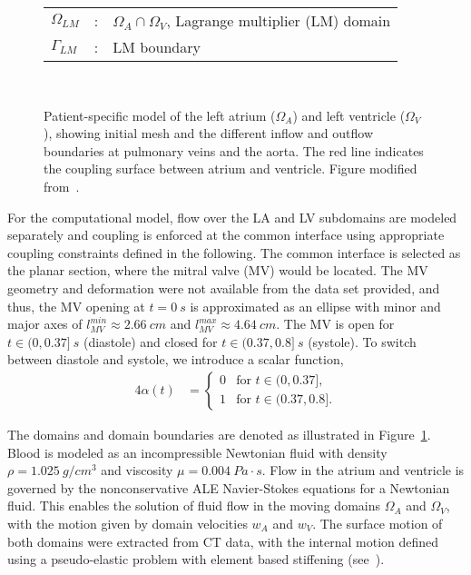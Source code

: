 \documentclass[3p]{elsarticle}
\begin{document}
\begin{figure}[ht!]
\begin{minipage}{0.37\linewidth}
\begin{tabular}{ l  c  l }
            \hline
            $\Omega_{LM}$   &:& $\Omega_A \cap \Omega_V$, Lagrange multiplier (LM) domain         \\
            $\Gamma_{LM}$   &:& LM boundary                             \\
        \end{tabular}
    \end{minipage}~\\
    \caption{Patient-specific model of the left atrium ($\Omega_A$) and left ventricle ($\Omega_V$),
        showing initial mesh and the different inflow and outflow boundaries at pulmonary veins and the aorta.
        The red line indicates the coupling surface between atrium and ventricle.
        Figure modified from~\cite[Figure 3]{MarleviEtAl2021}.}
    \label{lv-flow-application-coarse-mesh-views-fig}
\end{figure}

For the computational model, flow over the LA and LV subdomains
are modeled separately and coupling is enforced at the common interface
using appropriate coupling constraints defined in the following.
The common interface is selected as the planar section,
where the mitral valve (MV) would be located.
The MV geometry and deformation were not available from the data set
provided, and thus, the MV opening at $t = 0~s$ is approximated as an ellipse
with minor and major axes of $l_{MV}^{min} \approx 2.66~cm$ and $l_{MV}^{max} \approx 4.64~cm$.
The MV is open for $t \in (0, 0.37]~s$ (diastole) and closed for $t \in (0.37, 0.8]~s$ (systole).
To switch between diastole and systole, we introduce a scalar function,
\begin{alignat}{4}
    \alpha (t)
    &= \begin{cases}
        0 & \text{for } t \in (0, 0.37], \\
        1 & \text{for } t \in (0.37, 0.8].
    \end{cases}\label{alpha-switch-eqn}
\end{alignat}

The domains and domain boundaries are denoted as illustrated in Figure~\ref{lv-flow-application-coarse-mesh-views-fig}.
Blood is modeled as an incompressible Newtonian fluid
with density $\rho = 1.025~g / cm^3$
and viscosity $\mu = 0.004~Pa \cdot s$.
Flow in the atrium and ventricle is governed
by the nonconservative ALE Navier-Stokes equations for a Newtonian fluid.
This enables the solution of fluid flow in the moving domains $\Omega_A$
and $\Omega_V$, with the motion given by domain velocities $w_A$ and $w_V$.
The surface motion of both domains were extracted from CT data,
with the internal motion defined using a pseudo-elastic problem
with element based stiffening (see~\cite{BalmusMassingHoffmanRazaviNordsletten2020}).
\end{document}
